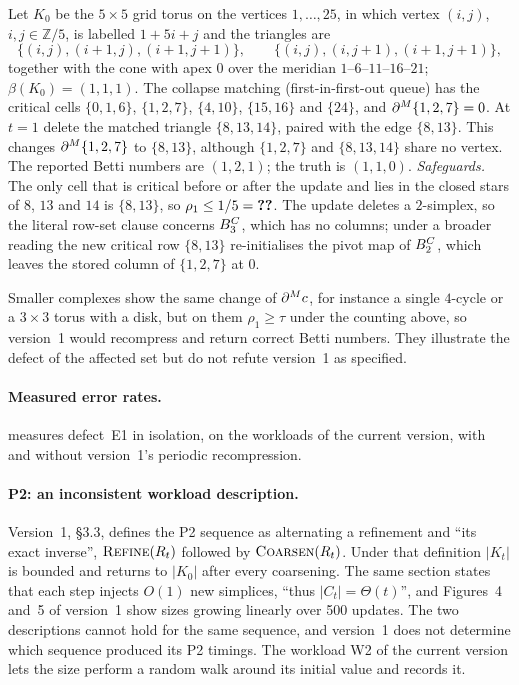 \begin{example}\label{ex:e2-torus}
Let $K_0$ be the $5\times5$ grid torus on the vertices $1,\dots,25$, in which
vertex $(i,j)$, $i,j\in\mathbb{Z}/5$, is labelled $1+5i+j$ and the triangles are
\[
  \{(i,j),(i{+}1,j),(i{+}1,j{+}1)\},\qquad \{(i,j),(i,j{+}1),(i{+}1,j{+}1)\},
\]
together with the cone with apex $0$ over the meridian $1$--$6$--$11$--$16$--$21$;
$\beta(K_0)=(1,1,1)$. The collapse matching (first-in-first-out queue) has the
critical cells $\{0,1,6\}$, $\{1,2,7\}$, $\{4,10\}$, $\{15,16\}$ and $\{24\}$, and
$\partial^{M}\{1,2,7\}=0$. At $t=1$ delete the matched triangle $\{8,13,14\}$, paired with
the edge $\{8,13\}$. This changes $\partial^{M}\{1,2,7\}$ to $\{8,13\}$, although
$\{1,2,7\}$ and $\{8,13,14\}$ share no vertex. The reported Betti numbers are
$(1,2,1)$; the truth is $(1,1,0)$.
\emph{Safeguards.} The only cell that is critical before or after the update
and lies in the closed stars of $8$, $13$ and $14$ is $\{8,13\}$, so
$\rho_1\le1/5=\textbf{??}$. The update deletes a $2$-simplex, so the literal
row-set clause concerns $B_{3}^C$, which has no columns; under a broader
reading the new critical row $\{8,13\}$ re-initialises the pivot map of
$B_{2}^C$, which leaves the stored column of $\{1,2,7\}$ at $0$.
\end{example}

Smaller complexes show the same change of $\partial^{M} c$, for instance a single
$4$-cycle or a $3\times3$ torus with a disk, but on them $\rho_1\ge\tau$ under
the counting above, so version~1 would recompress and return correct Betti
numbers. They illustrate the defect of the affected set but do not refute
version~1 as specified.

\paragraph{Measured error rates.}
 measures defect~E1 in isolation, on the workloads of the current
version, with and without version~1's periodic recompression.

\paragraph{P2: an inconsistent workload description.}
Version~1, \S3.3, defines the P2 sequence as alternating a refinement and ``its
exact inverse'', $\textsc{Refine}(R_t)$ followed by $\textsc{Coarsen}(R_t)$. Under
that definition $|K_t|$ is bounded and returns to $|K_0|$ after every
coarsening. The same section states that each step injects $O(1)$ new
simplices, ``thus $|C_t|=\Theta(t)$'', and Figures~4 and~5 of version~1 show
sizes growing linearly over 500 updates. The two descriptions cannot hold for
the same sequence, and version~1 does not determine which sequence produced its
P2 timings. The workload W2 of the current version lets the size perform a random walk
around its initial value and records it.


